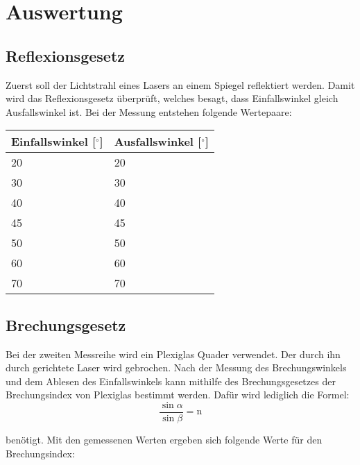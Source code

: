 \section{Auswertung}

\subsection{Reflexionsgesetz}

Zuerst soll der Lichtstrahl eines Lasers an einem Spiegel reflektiert werden. Damit wird das Reflexionsgesetz überprüft, welches besagt, dass Einfallswinkel \alpha gleich Ausfallswinkel \beta ist. Bei der Messung entstehen folgende Wertepaare:

\begin{minipage}{\linewidth}
    \begin{table}[H]
        \centering
    \begin{tabular}{ll}
        \toprule
        Einfallswinkel [$^\circ$] & Ausfallswinkel [$^\circ$] \\
        \midrule
        20 & 20 \\
        30 & 30 \\
        40 & 40 \\
        45 & 45 \\
        50 & 50 \\
        60 & 60 \\
        70 & 70 \\
        \bottomrule   
    \end{tabular}
    
    \label{tab:1}
\end{table}
\end{minipage}

\subsection{Brechungsgesetz}

Bei der zweiten Messreihe wird ein Plexiglas Quader verwendet. Der durch ihn durch gerichtete Laser wird gebrochen. Nach der Messung des Brechungswinkels und dem Ablesen des Einfallswinkels kann mithilfe des Brechungsgesetzes der Brechungsindex von Plexiglas bestimmt werden.
Dafür wird lediglich die Formel:
\begin{displaymath}
    \frac{\sin\alpha}{\sin\beta} = \text{n}
\end{displaymath}

\noindent benötigt. Mit den gemessenen Werten ergeben sich folgende Werte für den Brechungsindex:

